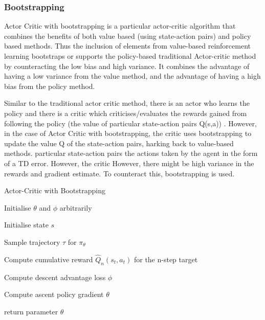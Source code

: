 \documentclass{article}
\begin{document}
\subsubsection{Bootstrapping}
\par Actor Critic with bootstrapping is a particular actor-critic algorithm that combines the benefits of both value based (using state-action pairs) and policy based methods. Thus the inclusion of elements from value-based reinforcement learning bootstraps or supports the policy-based traditional Actor-critic method by counteracting the low bias and high variance. It combines the advantage of having a low variance from the value method, and the advantage of having a high bias from the policy method.
\par Similar to the traditional actor critic method, there is an actor who learns the policy and there is a critic which criticises/evaluates the rewards gained from following the policy (the value of particular state-action pairs Q(s,a)) . However, in the case of Actor Critic with bootstrapping, the critic uses bootstrapping to update the value Q of the state-action pairs, harking back to value-based methods. \newline 
particular state-action pairs  the actions taken by the agent in the form of a TD error. However, the critic 
However, there might be high variance in the rewards and gradient estimate. To counteract this, bootstrapping is used.
\begin{algorithm}[htbp]
\caption{Actor-Critic with Bootstrapping}
\SetAlgoLined
\DontPrintSemicolon
\small %
Initialise $\theta$ and $\phi$ arbitrarily\;\\
{
    Initialise state $s$\;
     \item Sample trajectory $\tau$ for $\pi_\theta$
     \item
    {
     \item Compute cumulative reward $\hat{Q}_n(s_t,a_t)$  for the n-step target
    }
    \item Compute descent advantage loss $\phi$
    \item Compute ascent policy gradient $\theta$
}
return parameter $\theta$\;
\end{algorithm}
\end{document}
